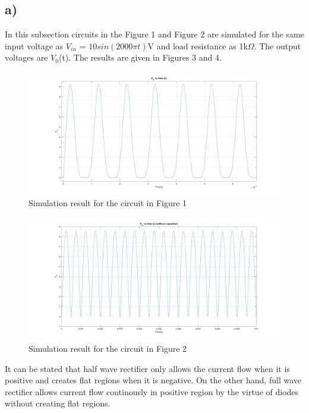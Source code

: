 \documentclass[letterpaper,12pt]{article}
\begin{document}
\subsection{a)}
In this subsection circuits in the Figure 1 and Figure 2 are simulated for the same input voltage as \(V_{in} \) = \(10sin(2000\pi t)\)V and load resistance as 1k\(\Omega\). The output voltages are \(V_0\)(t). The results are given in Figures 3 and 4.
\begin{figure}[H]
	\centering
   \includegraphics[width=1\textwidth]{PRE_2a.png}
   \caption{Simulation result for the circuit in Figure 1}
\end{figure} 
\begin{figure}[H]
	\centering
   \includegraphics[width=1\textwidth]{2a2_plot.png}
   \caption{Simulation result for the circuit in Figure 2} 
\end{figure} 
It can be stated that half wave rectifier only allows the current flow when it is positive and creates flat regions when it is negative. On the other hand, full wave rectifier allows current flow continously in positive region by the virtue of diodes without creating flat regions.
\end{document}
